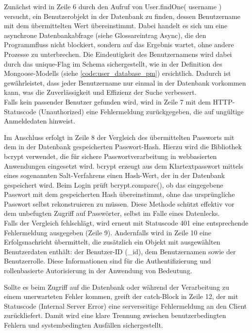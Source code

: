Zunächst wird in Zeile 6 durch den Aufruf von \glqq User.findOne({ username })\grqq{} versucht, ein Benutzerobjekt in der Datenbank zu finden, dessen Benutzername mit dem übermittelten Wert übereinstimmt. Dabei handelt es sich um eine asynchrone Datenbankabfrage (siehe Glossareintrag \gls{Async}), die den Programmfluss nicht blockiert, sondern auf das Ergebnis wartet, ohne andere Prozesse zu unterbrechen.
Die Eindeutigkeit des Benutzernamens wird dabei durch das \glqq unique-Flag\grqq{} im Schema sichergestellt, wie in der Definition des Mongoose-Modells (siehe \autoref{code:user_database_pm}) ersichtlich.
Dadurch ist gewährleistet, dass jeder Benutzername nur einmal in der Datenbank vorkommen kann, was die Zuverlässigkeit und Effizienz der Suche verbessert.\\
Falls kein passender Benutzer gefunden wird, wird in Zeile 7 mit dem HTTP-Statuscode  (Unauthorized)\grqq{} eine Fehlermeldung zurückgegeben, die auf ungültige Anmeldedaten hinweist.

Im Anschluss erfolgt in Zeile 8 der Vergleich des übermittelten Passworts mit dem in der Datenbank gespeicherten Passwort-Hash. Hierzu wird die Bibliothek bcrypt verwendet, die für sichere Passwortverarbeitung in webbasierten Anwendungen eingesetzt wird. bcrypt erzeugt aus dem Klartextpasswort mittels eines sogenannten Salt-Verfahrens einen Hash-Wert, der in der Datenbank gespeichert wird. Beim Login prüft \glqq bcrypt.compare()\grqq{}, ob das eingegebene Passwort mit dem gespeicherten Hash übereinstimmt, ohne das ursprüngliche Passwort selbst rekonstruieren zu müssen. Diese Methode schützt effektiv vor dem unbefugten Zugriff auf Passwörter, selbst im Falle eines Datenlecks.\\
Falls der Vergleich fehlschlägt, wird erneut mit Statuscode 401 eine entsprechende Fehlermeldung ausgegeben (Zeile 9). Andernfalls wird in Zeile 10 eine Erfolgsnachricht übermittelt, die zusätzlich ein Objekt mit ausgewählten Benutzerdaten enthält: der Benutzer-ID (\_id), dem Benutzernamen sowie der Benutzerrolle. Diese Informationen sind für die Authentifizierung und rollenbasierte Autorisierung in der Anwendung von Bedeutung.

Sollte es beim Zugriff auf die Datenbank oder während der Verarbeitung zu einem unerwarteten Fehler kommen, greift der catch-Block in Zeile 12, der mit Statuscode  (Internal Server Error)\grqq{} eine serverseitige Fehlermeldung an den Client zurückliefert. Damit wird eine klare Trennung zwischen benutzerbedingten Fehlern und systembedingten Ausfällen sichergestellt.

